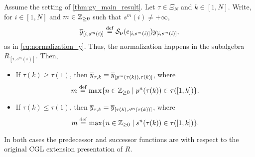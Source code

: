 \begin{proposition}\label{prop:y_tau_is_y_bracket}
	Assume the setting of \cref{thm:gy_main_result}. Let $\tau \in \Xi_N$ and $k \in [1, N]$. Write, for $i \in [1, N]$ and $m \in \mathbb{Z}_{\geq 0}$ such that $s^m(i) \neq +\infty$,
	\begin{equation*}
		\overline{y}_{[i, s^m(i)]} \overset{\mathrm{def}}{=} \mathcal{S}_{\boldsymbol{\nu}}(e_{[i, s^m(i)]})y_{[i, s^m(i)]},
	\end{equation*}
	as in \cref{eq:normalization_y}. Thus, the normalization happens in the subalgebra
	$R_{[i, s^m(i)]}$. Then,
	\begin{itemize}
		\item If $\tau(k) \geq \tau(1)$, then $\overline{y}_{\tau,k} = \overline{y}_{[p^m(\tau(k)), \tau(k)]}$, where
		      \begin{equation*}
			      m \overset{\mathrm{def}}{=} \max\{n \in \mathbb{Z}_{\geq 0} \mid p^n(\tau(k)) \in \tau([1,k])\}.
		      \end{equation*}
		\item If $\tau(k) \leq \tau(1)$, then $\overline{y}_{\tau,k} = \overline{y}_{[\tau(k),s^m( \tau(k))]}$, where
		      \begin{equation*}
			      m \overset{\mathrm{def}}{=} \max\{n \in \mathbb{Z}_{\geq 0} \mid s^n(\tau(k)) \in \tau([1,k])\}.
		      \end{equation*}
	\end{itemize}
	In both cases the predecessor and successor functions are with respect to the original
	CGL extension presentation of $R$.
\end{proposition}
